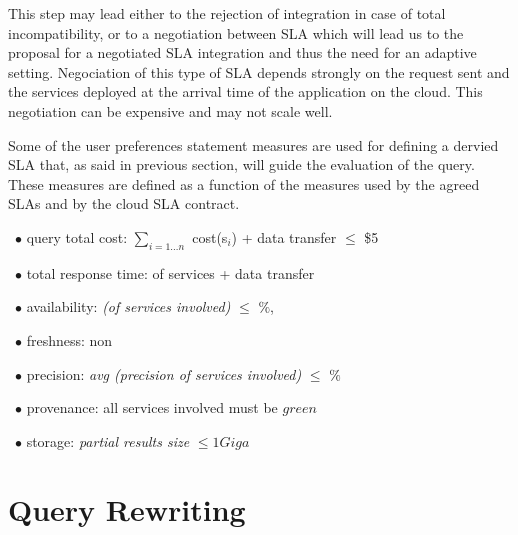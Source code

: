 This step may lead either to the rejection of integration in case of total incompatibility, or to a negotiation between SLA which will lead us to the proposal for a negotiated SLA integration and thus the need for an adaptive setting.
%
%
%
 Negociation of this type of SLA depends strongly on the request sent and the services deployed at the arrival time of the application on the cloud. This negotiation can be expensive and may not scale well.

Some of the user preferences statement measures are used for defining a dervied SLA that, as said in previous section, will guide the evaluation of the query. These measures are defined as a function of the measures used by the agreed SLAs and by the cloud SLA contract.
\begin{trivlist}\sf\footnotesize
\item[~$\bullet$ ] query total cost: $\sum_{i = 1\dots n}$ cost(s$_i$) + data transfer $\leq$ \$5
 \item[~$\bullet$ ] total response time: of services + data transfer
 \item[~$\bullet$ ] availability: {\em (of services involved)} $\leq$ {$\%$}, 
 \item[~$\bullet$ ] freshness: non 
 \item[~$\bullet$ ] precision: {\em avg (precision of services involved)} $\leq$ {$\%$}
 \item[~$\bullet$ ] provenance:  all services involved must be $green$
 \item[~$\bullet$ ] storage: {\em partial results size} $\leq 1 Giga$ 
 \end{trivlist} 
 
\section{Query Rewriting}
\label{sec:queryRew}

